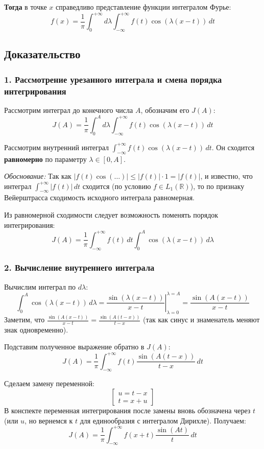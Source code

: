 \documentclass[12pt,a4paper,openany]{book}
\begin{document}
\noindent \textbf{Тогда} в точке $x$ справедливо представление функции интегралом Фурье:
$$ f(x) = \frac{1}{\pi} \int_{0}^{+\infty} d\lambda \int_{-\infty}^{+\infty} f(t) \cos(\lambda(x-t)) \, dt $$

\subsection{Доказательство}

\subsubsection*{1. Рассмотрение урезанного интеграла и смена порядка интегрирования}
Рассмотрим интеграл до конечного числа $A$, обозначим его $J(A)$:
$$ J(A) = \frac{1}{\pi} \int_{0}^{A} d\lambda \int_{-\infty}^{+\infty} f(t) \cos(\lambda(x-t)) \, dt $$

Рассмотрим внутренний интеграл $\int_{-\infty}^{+\infty} f(t) \cos(\lambda(x-t)) \, dt$. Он сходится \textbf{равномерно} по параметру $\lambda \in [0, A]$.

\noindent \textit{Обоснование:}
Так как $\left| f(t) \cos(\dots) \right| \le |f(t)| \cdot 1 = |f(t)|$, и известно, что интеграл $\int_{-\infty}^{+\infty} |f(t)| \, dt$ сходится (по условию $f \in L_1(\mathbb{R})$), то по признаку Вейерштрасса сходимость исходного интеграла равномерная.

Из равномерной сходимости следует возможность поменять порядок интегрирования:
$$ J(A) = \frac{1}{\pi} \int_{-\infty}^{+\infty} f(t) \, dt \int_{0}^{A} \cos(\lambda(x-t)) \, d\lambda $$

\subsubsection*{2. Вычисление внутреннего интеграла}
Вычислим интеграл по $d\lambda$:
$$ \int_{0}^{A} \cos(\lambda(x-t)) \, d\lambda = \left. \frac{\sin(\lambda(x-t))}{x-t} \right|_{\lambda=0}^{\lambda=A} = \frac{\sin(A(x-t))}{x-t} $$
Заметим, что $\frac{\sin(A(x-t))}{x-t} = \frac{\sin(A(t-x))}{t-x}$ (так как синус и знаменатель меняют знак одновременно).

Подставим полученное выражение обратно в $J(A)$:
$$ J(A) = \frac{1}{\pi} \int_{-\infty}^{+\infty} f(t) \frac{\sin(A(t-x))}{t-x} \, dt $$

Сделаем замену переменной:
$$ \left[ \begin{gathered} u = t-x \\ t = x+u \end{gathered} \right] $$
В конспекте переменная интегрирования после замены вновь обозначена через $t$ (или $u$, но вернемся к $t$ для единообразия с интегралом Дирихле). Получаем:
$$ J(A) = \frac{1}{\pi} \int_{-\infty}^{+\infty} f(x+t) \frac{\sin(At)}{t} \, dt $$
\end{document}
